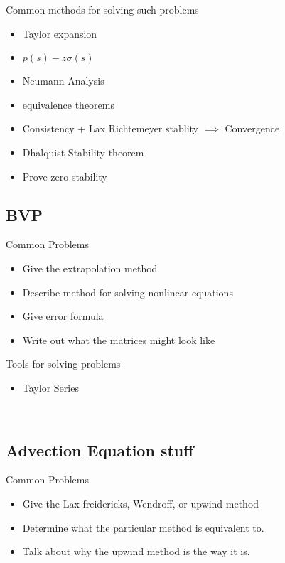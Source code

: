 \documentclass[12pt]{article}
\begin{document}
Common methods for solving such problems
\begin{itemize}
	\item Taylor expansion
	\item $p(s)-z\sigma(s)$
	\item Neumann Analysis
	\item equivalence theorems
	\item Consistency + Lax Richtemeyer stablity $\implies$ Convergence
	\item Dhalquist Stability theorem
	\item Prove zero stability
\end{itemize}

\subsection{BVP}
Common Problems
\begin{itemize}
	\item Give the extrapolation method
	\item Describe method for solving nonlinear equations
	\item Give error formula
	\item Write out what the matrices might look like
\end{itemize}

Tools for solving problems
\begin{itemize}
	\item Taylor Series
\end{itemize}
\\
\subsection{Advection Equation stuff}
Common Problems
\begin{itemize}
	\item Give the Lax-freidericks, Wendroff, or upwind method
	\item Determine what the particular method is equivalent to.
	\item Talk about why the upwind method is the way it is.
\end{itemize}
\end{document}
